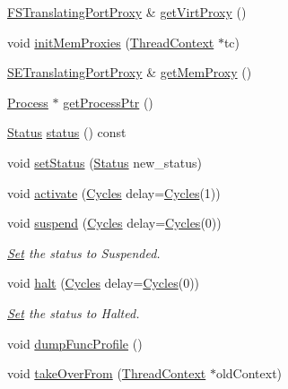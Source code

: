 \begin{DoxyCompactItemize}
\item 
\hyperlink{classFSTranslatingPortProxy}{FSTranslatingPortProxy} \& \hyperlink{classProxyThreadContext_ac7399661f9073ba4ec121b87c782924b}{getVirtProxy} ()
\item 
void \hyperlink{classProxyThreadContext_ab24719c7923d7d57030fa05bb166c62c}{initMemProxies} (\hyperlink{classThreadContext}{ThreadContext} $\ast$tc)
\item 
\hyperlink{classSETranslatingPortProxy}{SETranslatingPortProxy} \& \hyperlink{classProxyThreadContext_ab07f5af63c9d22e504dfe620c0a07228}{getMemProxy} ()
\item 
\hyperlink{classProcess}{Process} $\ast$ \hyperlink{classProxyThreadContext_a4b26cb784639047bab9de2b306955c4b}{getProcessPtr} ()
\item 
\hyperlink{classThreadContext_a67a0db04d321a74b7e7fcfd3f1a3f70b}{Status} \hyperlink{classProxyThreadContext_a2ad9e92a82d6f783b3061584729c2f4a}{status} () const 
\item 
void \hyperlink{classProxyThreadContext_acdf331c877974ed8697216475a21998d}{setStatus} (\hyperlink{classThreadContext_a67a0db04d321a74b7e7fcfd3f1a3f70b}{Status} new\_\-status)
\item 
void \hyperlink{classProxyThreadContext_ab542a5cf9ce4b41042d61e42dfe3aeab}{activate} (\hyperlink{classCycles}{Cycles} delay=\hyperlink{classCycles}{Cycles}(1))
\item 
void \hyperlink{classProxyThreadContext_a32072550286c5735b4b95349efa8e4f6}{suspend} (\hyperlink{classCycles}{Cycles} delay=\hyperlink{classCycles}{Cycles}(0))
\begin{DoxyCompactList}\small\item\em \hyperlink{classSet}{Set} the status to Suspended. \item\end{DoxyCompactList}\item 
void \hyperlink{classProxyThreadContext_ade40686c5cdae8911d4062b9bf3d5340}{halt} (\hyperlink{classCycles}{Cycles} delay=\hyperlink{classCycles}{Cycles}(0))
\begin{DoxyCompactList}\small\item\em \hyperlink{classSet}{Set} the status to Halted. \item\end{DoxyCompactList}\item 
void \hyperlink{classProxyThreadContext_a13fa12d1779a94a1e0b968946a1367c7}{dumpFuncProfile} ()
\item 
void \hyperlink{classProxyThreadContext_a5811640aa3008d2916f3d3aba621b82d}{takeOverFrom} (\hyperlink{classThreadContext}{ThreadContext} $\ast$oldContext)

\end{DoxyCompactItemize}
